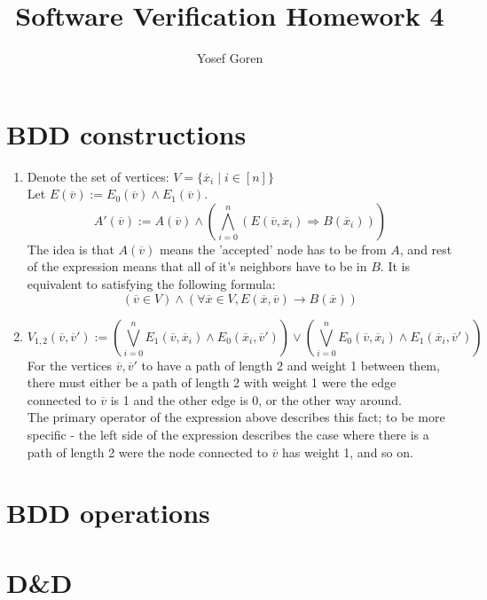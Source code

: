 \documentclass{article}
\newcommand{\lv}[0]{\overline{v}}
\newcommand{\lx}[0]{\overline{x}}
\begin{document}
\author{Yosef Goren}
\title{Software Verification Homework 4}
\section{BDD constructions}
\begin{enumerate}[label=\textbf{\alph*.}]
    \item 
        Denote the set of vertices: $V=\{\lx_i\mid i\in[n]\}$\\
        Let $E(\lv):=E_0(\lv)\wedge E_1(\lv)$.
        \[
            A'(\lv):=A(\lv)\wedge \left(\bigwedge_{i=0}^n(E(\lv,\lx_i)\Rightarrow B(\lx_i))\right)
        \]
        The idea is that $A(\lv)$ means the 'accepted' node has to be from $A$,
        and rest of the expression means that all of it's neighbors have to be in $B$.
        It is equivalent to satisfying the following formula:
        \[
            (\lv\in V)\wedge \left(\forall \lx\in V, E(\lx, \lv)\rightarrow B(\lx)\right)
        \]
    \item 
    \[
        V_{1,2}(\lv,\lv'):=
            \left(\bigvee_{i=0}^nE_1(\lv, \lx_i)\wedge E_0(\lx_i, \lv')\right)
            \vee
            \left(\bigvee_{i=0}^nE_0(\lv, \lx_i)\wedge E_1(\lx_i, \lv')\right)
    \]
    For the vertices $\lv,\lv'$ to have a 
    path of length 2 and weight 1 between them,
    there must either be a path of length 2 with weight
    1 were the edge connected to $\lv$ is 1 and the other edge is 0,
    or the other way around.\\
    The primary operator of the expression above describes this fact;
    to be more specific - the left side of the expression
    describes the case where there is a path of length 2 
    were the node connected to $\lv$ has weight 1, and so on.
\end{enumerate}
    
\section{BDD operations}
\section{D\&D}
\maketitle
\end{document}
